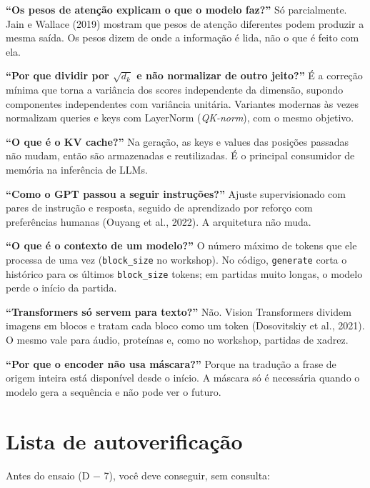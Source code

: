 \documentclass[
  11pt,
]{article}
\begin{document}
\textbf{``Os pesos de atenção explicam o que o modelo faz?''} Só
parcialmente. Jain e Wallace (2019) mostram que pesos de atenção
diferentes podem produzir a mesma saída. Os pesos dizem de onde a
informação é lida, não o que é feito com ela.

\textbf{``Por que dividir por \(\sqrt{d_k}\) e não normalizar de outro
jeito?''} É a correção mínima que torna a variância dos scores
independente da dimensão, supondo componentes independentes com
variância unitária. Variantes modernas às vezes normalizam queries e
keys com LayerNorm (\emph{QK-norm}), com o mesmo objetivo.

\textbf{``O que é o KV cache?''} Na geração, as keys e values das
posições passadas não mudam, então são armazenadas e reutilizadas. É o
principal consumidor de memória na inferência de LLMs.

\textbf{``Como o GPT passou a seguir instruções?''} Ajuste
supervisionado com pares de instrução e resposta, seguido de aprendizado
por reforço com preferências humanas (Ouyang et al., 2022). A
arquitetura não muda.

\textbf{``O que é o contexto de um modelo?''} O número máximo de tokens
que ele processa de uma vez (\texttt{block\_size} no workshop). No
código, \texttt{generate} corta o histórico para os últimos
\texttt{block\_size} tokens; em partidas muito longas, o modelo perde o
início da partida.

\textbf{``Transformers só servem para texto?''} Não. Vision Transformers
dividem imagens em blocos e tratam cada bloco como um token (Dosovitskiy
et al., 2021). O mesmo vale para áudio, proteínas e, como no workshop,
partidas de xadrez.

\textbf{``Por que o encoder não usa máscara?''} Porque na tradução a
frase de origem inteira está disponível desde o início. A máscara só é
necessária quando o modelo gera a sequência e não pode ver o futuro.

\section{Lista de autoverificação}\label{lista-de-autoverificauxe7uxe3o}

Antes do ensaio (D − 7), você deve conseguir, sem consulta:
\end{document}
